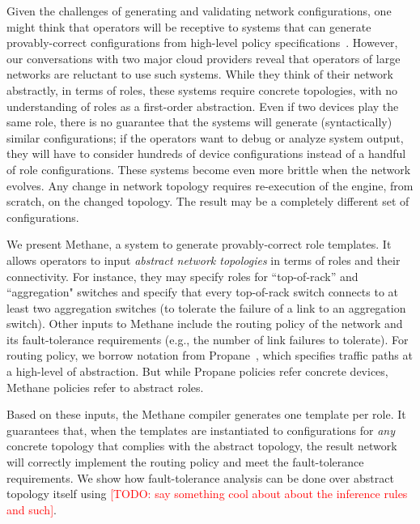 \documentclass[numbers, 10pt, preprint]{sigplanconf}
\newcommand{\todo}[1]{\textcolor{red}{[TODO: #1]}}
\newcommand{\sysname}{{\small \sf Methane}\xspace}
\begin{document}

Given the challenges of generating and validating network configurations, one might think that operators will be receptive to systems that can generate provably-correct configurations from high-level policy specifications~\cite{x,y,z,configassure,propane}. However, our conversations with two major cloud providers reveal that operators of large networks are reluctant to use such systems. While they think of their network abstractly, in terms of roles, these systems require concrete topologies, with no understanding of roles as a first-order abstraction.
Even if two devices play the same role,
there is no guarantee that the systems will generate (syntactically) similar configurations; if the operators want to debug or analyze system output, they will have to consider
hundreds of device configurations instead of a handful of role configurations. These systems become even more brittle when the network evolves. Any change in network topology requires re-execution of the engine, from scratch, on the changed topology.  The result may be
a completely different set of configurations.

We present \sysname, a system to generate provably-correct role templates. It allows operators to input \emph{abstract network topologies} in terms of roles and their connectivity. For instance, they may specify roles for ``top-of-rack'' and ``aggregation" switches and specify that every top-of-rack switch connects to at least two aggregation switches (to tolerate the failure of a link to an aggregation switch). Other inputs to \sysname include the routing policy of the network and its fault-tolerance requirements (e.g., the number of link failures to tolerate). For routing policy, we borrow notation from Propane~\cite{propane},  which specifies traffic paths at a high-level of abstraction. But while Propane policies
refer concrete devices, \sysname policies refer to abstract roles.

Based on these inputs, the \sysname compiler generates one template per role. It guarantees that, when the templates are instantiated to configurations for {\em any} concrete topology that complies with the abstract topology, the result network will correctly implement the routing policy and meet the fault-tolerance requirements. We show how fault-tolerance analysis can be done over abstract topology itself using \todo{say something cool about about the inference rules and such}.
\end{document}

